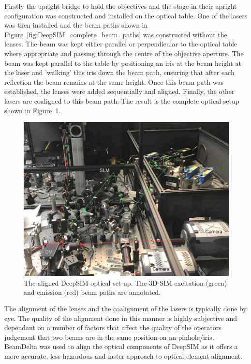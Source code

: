 Firstly the upright bridge to hold the objectives and the stage in their upright configuration was constructed and installed on the optical table. One of the lasers was then installed and the beam paths shown in Figure~\ref{fig:DeepSIM_complete_beam_paths} was constructed without the lenses. The beam was kept either parallel or perpendicular to the optical table where appropriate and passing through the centre of the objective aperture. The beam was kept parallel to the table by positioning an iris at the beam height at the laser and 'walking' this iris down the beam path, ensuring that after each reflection the beam remains at the same height. Once this beam path was established, the lenses were added sequentially and aligned. Finally, the other lasers are coaligned to this beam path. The result is the complete optical setup shown in Figure~\ref{fig:DeepSIM_physical_optics}.

\begin{figure}[h]
	\centering
	\includegraphics[width=\textwidth]{images/DeepSIM_SIM_path_annotated_bright.jpg}
	\caption{The aligned DeepSIM optical set-up. The 3D-SIM excitation (green) and emission (red) beam paths are annotated.}
	\label{fig:DeepSIM_physical_optics}
\end{figure}

The alignment of the lenses and the coalignment of the lasers is typically done by eye. The quality of the alignment done in this manner is highly subjective and dependant on a number of factors that affect the quality of the operators judgement that two beams are in the same position on an pinhole/iris. BeamDelta was used to align the optical components of DeepSIM as it offers a more accurate, less hazardous and faster approach to optical element alignment.\cite{dobbie2019beamdelta}

